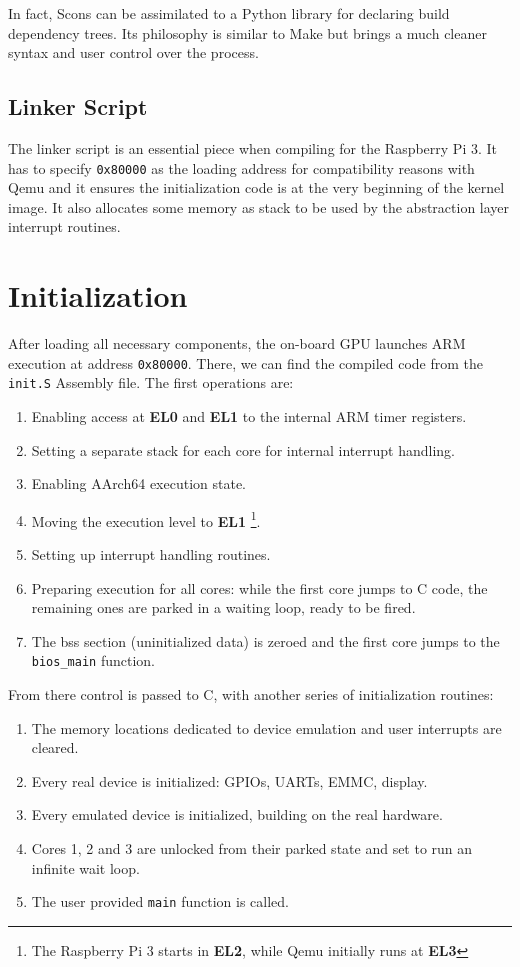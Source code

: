 \documentclass[12pt,a4paper,openright,twoside]{report}
\begin{document}
In fact, Scons can be assimilated to a Python library for declaring build dependency
trees. Its philosophy is similar to Make but brings a much cleaner syntax and 
user control over the process. 

\subsection{Linker Script}
The linker script is an essential piece when compiling for the Raspberry Pi 3. It has
to specify {\tt 0x80000} as the loading address for compatibility reasons with Qemu
and it ensures the initialization code is at the very beginning of the kernel image.
It also allocates some memory as stack to be used by the abstraction layer interrupt
routines.

\section{Initialization}
After loading all necessary components, the on-board GPU launches ARM execution at 
address {\tt 0x80000}. There, we can find the compiled code from the 
{\tt init.S} Assembly file.
The first operations are:
\begin{enumerate}
    \item Enabling access at \textbf{EL0} and \textbf{EL1} to the internal ARM 
        timer registers.
    \item Setting a separate stack for each core for internal interrupt handling.
    \item Enabling AArch64 execution state.
    \item Moving the execution level to \textbf{EL1} \footnote{The Raspberry Pi 3
     starts in \textbf{EL2}, while Qemu initially runs at \textbf{EL3}}.
    \item Setting up interrupt handling routines.
    \item Preparing execution for all cores: while the first core jumps to C code,
        the remaining ones are parked in a waiting loop, ready to be fired.
    \item The bss section (uninitialized data) is zeroed and the first core jumps
        to the {\tt bios\_main} function.
\end{enumerate}

From there control is passed to C, with another series of initialization routines:
\begin{enumerate}
    \item The memory locations dedicated to device emulation and user interrupts
        are cleared.
    \item Every real device is initialized: GPIOs, UARTs, EMMC, display.
    \item Every emulated device is initialized, building on the real hardware.
    \item Cores 1, 2 and 3 are unlocked from their parked state and set to 
        run an infinite wait loop.
    \item The user provided {\tt main} function is called.
\end{enumerate}
\end{document}
